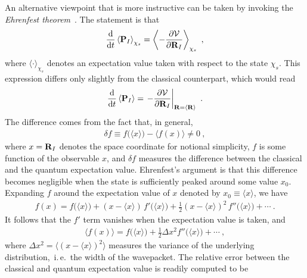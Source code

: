 An alternative viewpoint that is more instructive can be taken by invoking the \emph{Ehrenfest theorem}~\cite{Ehrenfest1927,Basdevant2007}. The statement is that
\begin{align}
  \frac{\d}{\d t} \left\langle {\bf P}_I \right\rangle_{\chi_s}
    = \left\langle
      - \frac{\partial \mathcal{V}}{\partial {\bf R}_I}
    \right\rangle_{\chi_s}~,
  \label{eq:ehrenfest.de1}
\end{align}
where $\langle \cdot \rangle_{\chi_s}$ denotes an expectation value taken with respect to the state $\chi_s$. This expression differs only slightly from the classical counterpart, which would read
\begin{align}
\frac{\d}{\d t} \left\langle {\bf P}_I \right\rangle
= \left.
- \frac{\partial \mathcal{V}}{\partial {\bf R}_I}
\right\vert_{{\bf R} = \langle {\bf R} \rangle}~.
\label{eq:ehrenfest.de2}
\end{align}
The difference comes from the fact that, in general,
\begin{align}
  \delta f  \equiv 
  f \bm ( \langle x \rangle \bm{)} 
  - 
  \bm{\langle} f (x) \bm{\rangle}
  \neq 0
  ~,
  \label{eq:ehrenfest.delta1}
\end{align}
where $x = {\bf R}_I$ denotes the space coordinate for notional simplicity, $f$ is some function of the observable $x$, and $\delta f$ measures the difference between the classical and the quantum expectation value. Ehrenfest's argument is that this difference becomes negligible when the state is sufficiently peaked around some value $x_0$. Expanding $f$ around the expectation value of $x$ denoted by $x_0 \equiv \langle x \rangle$, we have
\begin{align}
  f(x) = f \bm ( \langle x \rangle \bm{)}  
    + (x - \langle x \rangle) \, f' \bm ( \langle x \rangle \bm{)}
    + \frac{1}{2} (x - \langle x \rangle)^2 \, f'' \bm ( \langle x \rangle \bm{)}
    + \cdots~.
  \label{eq:ehrenfest.f2}
\end{align}
It follows that the $f'$ term vanishes when the expectation value is taken, and
\begin{align}
\langle f(x) \rangle 
  = f \bm ( \langle x \rangle \bm{)}  
    + \frac{1}{2} \Delta x^2 f'' \bm ( \langle x \rangle \bm{)}
    + \cdots~,
\label{eq:ehrenfest.f3}
\end{align}
where $\Delta x^2 = \bm{\langle} (x - \langle x \rangle)^2 \bm{\rangle}$ measures the variance of the underlying distribution,~i.\,e.~the width of the wavepacket. The relative error between the classical and quantum expectation value is readily computed to be
